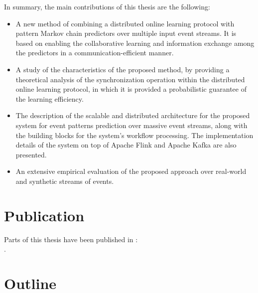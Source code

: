 In summary, the main contributions of this thesis are the following:

\begin{itemize}

	\item  A new method of combining a distributed online learning protocol \cite{kamp2016communication} with pattern Markov chain predictors \cite{alevizos2017event} over multiple input event streams. It is based on enabling the collaborative learning and information exchange among the predictors in a communication-efficient manner.  
	
	\item A study of the characteristics of the proposed method, by providing a theoretical analysis of the synchronization operation within the distributed online learning protocol, in which it is provided a probabilistic guarantee of the learning efficiency. 
	
	\item The description of the scalable and distributed architecture for the proposed system for event patterns prediction over massive event streams, along with the building blocks for the system's workflow processing. The implementation details of the system on top of Apache Flink and Apache Kafka are also presented. 
	
	\item An extensive empirical evaluation of the proposed approach over real-world and synthetic streams of events.
  
\end{itemize}


\section{Publication}

Parts of this thesis have been published in \cite{Qadah}:\\ 
.

\section{Outline }

	
